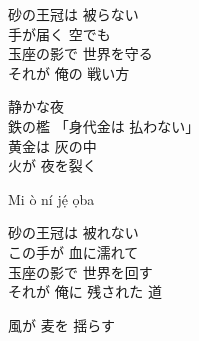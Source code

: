 \begin{lyrics}
\begin{japanese}
砂の王冠は 被らない\\
手が届く 空でも\\
玉座の影で 世界を守る\\
それが 俺の 戦い方
\end{japanese}

\begin{japanese}
静かな夜\\
鉄の檻
「身代金は 払わない」\\
黄金は 灰の中\\
火が 夜を裂く\\
\end{japanese}
 Mi ò ní jẹ́ ọba

\begin{japanese}
砂の王冠は 被れない\\
この手が 血に濡れて\\
玉座の影で 世界を回す\\
それが 俺に 残された 道
\end{japanese}

\begin{japanese}
風が 麦を 揺らす
\end{japanese}
\end{lyrics}

